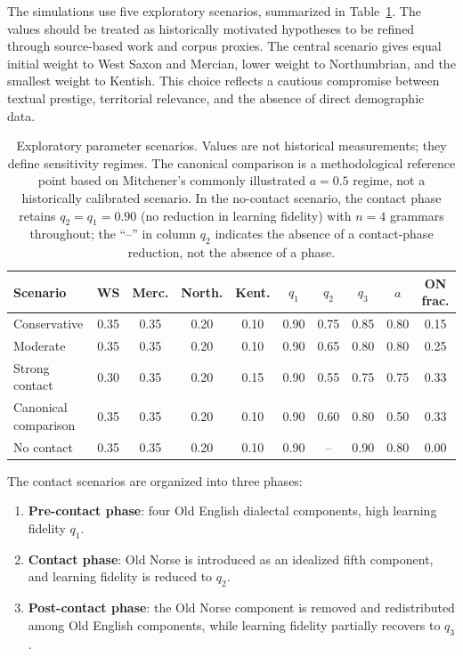 \documentclass[11pt]{article}
\begin{document}
The simulations use five exploratory scenarios, summarized in Table~\ref{tab:scenarios}. The values should be treated as historically motivated hypotheses to be refined through source-based work and corpus proxies. The central scenario gives equal initial weight to West Saxon and Mercian, lower weight to Northumbrian, and the smallest weight to Kentish. This choice reflects a cautious compromise between textual prestige, territorial relevance, and the absence of direct demographic data.

\begin{table}[h]
\centering
\caption{Exploratory parameter scenarios. Values are not historical measurements; they define sensitivity regimes. The canonical comparison is a methodological reference point based on Mitchener's commonly illustrated $a=0.5$ regime, not a historically calibrated scenario. In the no-contact scenario, the contact phase retains $q_2 = q_1 = 0.90$ (no reduction in learning fidelity) with $n = 4$ grammars throughout; the ``--'' in column $q_2$ indicates the absence of a contact-phase reduction, not the absence of a phase.}
\label{tab:scenarios}
\begin{tabular}{lccccccccc}
\toprule
Scenario & WS & Merc. & North. & Kent. & $q_1$ & $q_2$ & $q_3$ & $a$ & ON frac. \\
\midrule
Conservative & 0.35 & 0.35 & 0.20 & 0.10 & 0.90 & 0.75 & 0.85 & 0.80 & 0.15 \\
Moderate & 0.35 & 0.35 & 0.20 & 0.10 & 0.90 & 0.65 & 0.80 & 0.80 & 0.25 \\
Strong contact & 0.30 & 0.35 & 0.20 & 0.15 & 0.90 & 0.55 & 0.75 & 0.75 & 0.33 \\
Canonical comparison & 0.35 & 0.35 & 0.20 & 0.10 & 0.90 & 0.60 & 0.80 & 0.50 & 0.33 \\
No contact & 0.35 & 0.35 & 0.20 & 0.10 & 0.90 & -- & 0.90 & 0.80 & 0.00 \\
\bottomrule
\end{tabular}
\end{table}

The contact scenarios are organized into three phases:
\begin{enumerate}[noitemsep]
    \item \textbf{Pre-contact phase}: four Old English dialectal components, high learning fidelity $q_1$.
    \item \textbf{Contact phase}: Old Norse is introduced as an idealized fifth component, and learning fidelity is reduced to $q_2$.
    \item \textbf{Post-contact phase}: the Old Norse component is removed and redistributed among Old English components, while learning fidelity partially recovers to $q_3$.
\end{enumerate}
\end{document}
